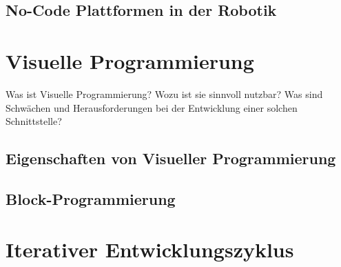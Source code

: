\subsection{No-Code Plattformen in der Robotik}

\section{Visuelle Programmierung} %
Was ist Visuelle Programmierung? Wozu ist sie sinnvoll nutzbar? Was sind Schwächen und Herausforderungen bei der Entwicklung einer solchen Schnittstelle?

\subsection{Eigenschaften von Visueller Programmierung}

\subsection{Block-Programmierung}

\section{Iterativer Entwicklungszyklus} %